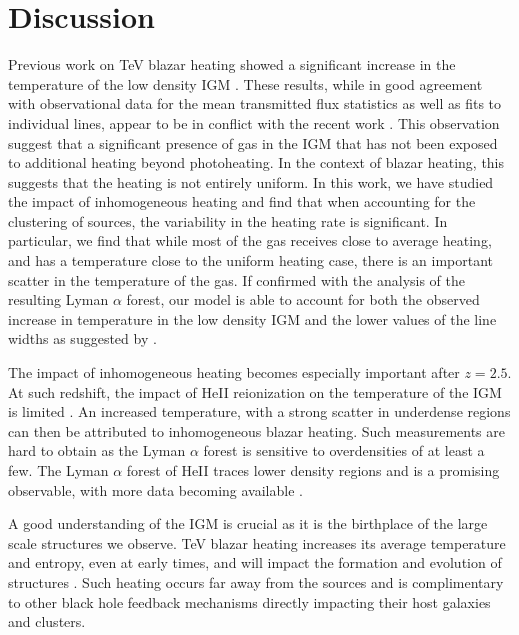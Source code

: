 \documentclass[numberedappendix]{emulateapj}
\begin{document}
\section{Discussion}
Previous work on TeV blazar heating showed a significant increase in the temperature of the low density IGM \citep{2012ApJ...752...23C,2012MNRAS.423..149P}. These results, while in good agreement with observational data for the mean transmitted flux statistics as well as fits to individual lines, appear to be in conflict with the recent work \citep{2012ApJ...757L..30R}. This observation suggest that a significant presence of gas in the IGM that has not been exposed to additional heating beyond photoheating. In the context of blazar heating, this suggests that the heating is not entirely uniform. In this work, we have studied the impact of inhomogeneous heating and find that when accounting for the clustering of sources, the variability in the heating rate is significant. In particular, we find that while most of the gas receives close to average heating, and has a temperature close to the uniform heating case, there is an important scatter in the temperature of the gas. If confirmed with the analysis of the resulting Lyman $\alpha$ forest, our model is able to account for both the observed increase in temperature in the low density IGM \citep{2014MNRAS.441.1916B,2009MNRAS.399L..39V} and the lower values of the line widths as suggested by \citet{2012ApJ...757L..30R}.

The impact of inhomogeneous heating becomes especially important after $z=2.5$. At such redshift, the impact of HeII reionization on the temperature of the IGM is limited \citep{2013MNRAS.435.3169C}. An increased temperature, with a strong scatter in underdense regions can then be attributed to inhomogeneous blazar heating. Such measurements are hard to obtain as the Lyman $\alpha$ forest is sensitive to overdensities of at least a few. The Lyman $\alpha$ forest of HeII traces lower density regions and is a promising observable, with more data becoming available \citep{2014arXiv1405.7405W}.

A good understanding of the IGM is crucial as it is the birthplace of the large scale structures we observe. TeV blazar heating increases its average temperature and entropy, even at early times, and will impact the formation and evolution of structures \citep{2012ApJ...752...24P}. Such heating occurs far away from the sources and is complimentary to other black hole feedback mechanisms directly impacting their host galaxies and clusters.
\end{document}
